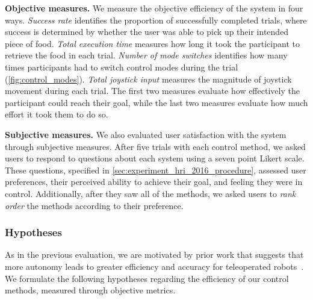 \textbf{Objective measures.} We measure the objective efficiency of the system in four ways. \emph{Success rate} identifies the proportion of successfully completed trials, where success is determined by whether the user was able to pick up their intended piece of food. \emph{Total execution time} measures how long it took the participant to retrieve the food in each trial. \emph{Number of mode switches} identifies how many times participants had to switch control modes during the trial (\cref{fig:control_modes}). \emph{Total joystick input} measures the magnitude of joystick movement during each trial. The first two measures evaluate how effectively the participant could reach their goal, while the last two measures evaluate how much effort it took them to do so.

\textbf{Subjective measures.} We also evaluated user satisfaction with the system through subjective measures. After five trials with each control method, we asked users to respond to questions about each system using a seven point Likert scale. These questions, specified in \cref{sec:experiment_hri_2016_procedure}, assessed user preferences, their perceived ability to achieve their goal, and feeling they were in control. Additionally, after they saw all of the methods, we asked users to \emph{rank order} the methods according to their preference. 

\subsubsection{Hypotheses}
\label{sec:hypoths_feeding}


As in the previous evaluation, we are motivated by prior work that suggests that more autonomy leads to greater efficiency and accuracy for teleoperated robots~\citep{you_2011, leeper_2012, dragan_2013_assistive, hauser_2013, javdani_2015_rss}. We formulate the following hypotheses regarding the efficiency of our control methods, measured through objective metrics.

\newhypothset



